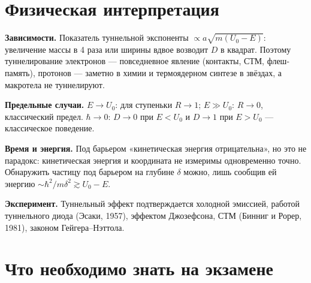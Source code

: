 \section{Физическая интерпретация}

\textbf{Зависимости.} Показатель туннельной экспоненты $\propto a\sqrt{m(U_0-E)}$: увеличение массы в
4 раза или ширины вдвое возводит $D$ в квадрат. Поэтому туннелирование электронов —
повседневное явление (контакты, СТМ, флеш-память), протонов — заметно в химии и термоядерном
синтезе в звёздах, а макротела не туннелируют.

\textbf{Предельные случаи.} $E\to U_0$: для ступеньки $R\to1$; $E\gg U_0$: $R\to0$, классический предел.
$\hbar\to0$: $D\to0$ при $E<U_0$ и $D\to1$ при $E>U_0$ — классическое поведение.

\textbf{Время и энергия.} Под барьером «кинетическая энергия отрицательна», но это не парадокс:
кинетическая энергия и координата не измеримы одновременно точно. Обнаружить частицу под барьером
на глубине $\delta$ можно, лишь сообщив ей энергию $\sim\hbar^2/m\delta^2\gtrsim U_0-E$.

\textbf{Эксперимент.} Туннельный эффект подтверждается холодной эмиссией, работой туннельного
диода (Эсаки, 1957), эффектом Джозефсона, СТМ (Бинниг и Рорер, 1981), законом Гейгера--Нэттола.

\section{Что необходимо знать на экзамене}

